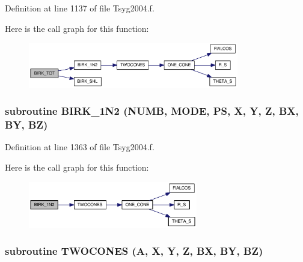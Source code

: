 Definition at line 1137 of file Tsyg2004.f.

Here is the call graph for this function:\nopagebreak
\begin{figure}[H]
\begin{center}
\leavevmode
\includegraphics[width=260pt]{_tsyg2004_8f_eb6fb8bb0214fdedda1df2ef2336c3fe_cgraph}
\end{center}
\end{figure}
\hypertarget{_tsyg2004_8f_a74cccacc3c5e631324e705627f8ef28}{
\subsubsection[{BIRK\_\-1N2}]{\setlength{\rightskip}{0pt plus 5cm}subroutine BIRK\_\-1N2 (NUMB, \/  MODE, \/  PS, \/  X, \/  Y, \/  Z, \/  BX, \/  BY, \/  BZ)}}
\label{_tsyg2004_8f_a74cccacc3c5e631324e705627f8ef28}




Definition at line 1363 of file Tsyg2004.f.

Here is the call graph for this function:\nopagebreak
\begin{figure}[H]
\begin{center}
\leavevmode
\includegraphics[width=209pt]{_tsyg2004_8f_a74cccacc3c5e631324e705627f8ef28_cgraph}
\end{center}
\end{figure}
\hypertarget{_tsyg2004_8f_da6b1a3dc7523ce7bc09c55324951441}{
\subsubsection[{TWOCONES}]{\setlength{\rightskip}{0pt plus 5cm}subroutine TWOCONES (A, \/  X, \/  Y, \/  Z, \/  BX, \/  BY, \/  BZ)}}
\label{_tsyg2004_8f_da6b1a3dc7523ce7bc09c55324951441}




